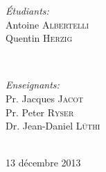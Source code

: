 \begin{titlepage}
\vfill %
\begin{minipage}{0.55\textwidth}
\begin{flushleft} \large
\emph{Étudiants:}\\
Antoine \textsc{Albertelli}\\ 
Quentin \textsc{Herzig}
\end{flushleft}
\end{minipage}
~
\begin{minipage}{0.4\textwidth}
\begin{flushleft} \large
\emph{Enseignants:} \\
Pr. Jacques \textsc{Jacot} \\
Pr. Peter \textsc{Ryser}\\
Dr. Jean-Daniel \textsc{Lüthi}
\end{flushleft}
\end{minipage}\\[2cm]


{\large 13 décembre 2013}
\end{titlepage}

\begin{titlepage}
    ~
\end{titlepage}


